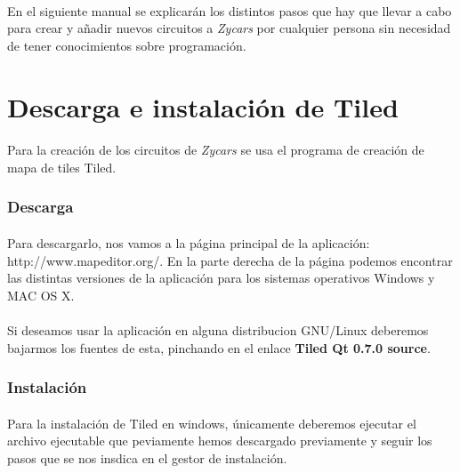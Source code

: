 \paragraph{}
En el siguiente manual se explicarán los distintos pasos que hay que llevar a cabo para crear y añadir nuevos circuitos a
\emph{Zycars} por cualquier persona sin necesidad de tener conocimientos sobre programación.

\section{Descarga e instalación de Tiled}

\paragraph{}
Para la creación de los circuitos de \emph{Zycars} se usa el programa de creación de mapa de tiles Tiled. 

\subsubsection{Descarga}

\paragraph{}
Para descargarlo, nos vamos a la página principal de la aplicación: http://www.mapeditor.org/. En la parte derecha de la 
página podemos encontrar las distintas versiones de la aplicación para los sistemas operativos Windows y MAC OS X.

\paragraph{}
Si deseamos usar la aplicación en alguna distribucion GNU/Linux deberemos bajarmos los fuentes de esta, pinchando en el enlace
\textbf{Tiled Qt 0.7.0 source}.

\subsubsection{Instalación}

\paragraph{}
Para la instalación de Tiled en windows, únicamente deberemos ejecutar el archivo ejecutable que peviamente hemos descargado
previamente y seguir los pasos que se nos insdica en el gestor de instalación.

